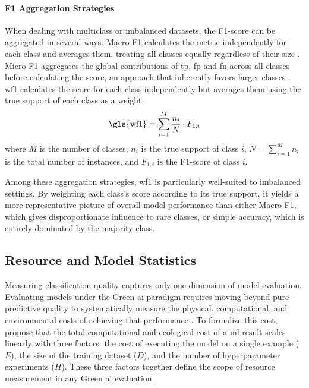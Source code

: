 \paragraph{F1 Aggregation Strategies}
When dealing with multiclass or imbalanced datasets, the F1-score can be aggregated in several ways. Macro F1 calculates the metric independently for each class and averages them, treating all classes equally regardless of their size \parencite{sokolovaSystematicAnalysisPerformance2009}. Micro F1 aggregates the global contributions of \gls{tp}, \gls{fp} and \gls{fn} across all classes before calculating the score, an approach that inherently favors larger classes \parencite{sokolovaSystematicAnalysisPerformance2009}. \gls{wf1} calculates the score for each class independently but averages them using the true support of each class as a weight:
\begin{equation}
    \text{\gls{wf1}} = \sum_{i=1}^{M} \frac{n_i}{N} \cdot F_{1,i}
    \label{eq:wf1}
\end{equation}
where $M$ is the number of classes, $n_i$ is the true support of class $i$, $N = \sum_{i=1}^{M} n_i$ is the total number of instances, and $F_{1,i}$ is the F1-score of class $i$.

Among these aggregation strategies, \gls{wf1} is particularly well-suited to imbalanced settings. By weighting each class's score according to its true support, it yields a more representative picture of overall model performance than either Macro F1, which gives disproportionate influence to rare classes, or simple accuracy, which is entirely dominated by the majority class.

\subsection{Resource and Model Statistics}

Measuring classification quality captures only one dimension of model evaluation. Evaluating models under the Green \gls{ai} paradigm requires moving beyond pure predictive quality to systematically measure the physical, computational, and environmental costs of achieving that performance \parencite{schwartzGreenAI2020}. To formalize this cost, \citeauthor{schwartzGreenAI2020} \parencite{schwartzGreenAI2020} propose that the total computational and ecological cost of a \gls{ml} result scales linearly with three factors: the cost of executing the model on a single example ($E$), the size of the training dataset ($D$), and the number of hyperparameter experiments ($H$). These three factors together define the scope of resource measurement in any Green \gls{ai} evaluation.

